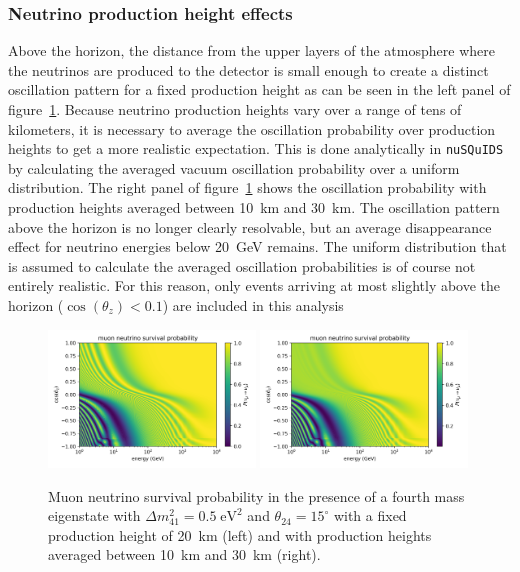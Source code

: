\subsubsection{Neutrino production height effects}
Above the horizon, the distance from the upper layers of the atmosphere where the neutrinos are produced to the detector is small enough to create a distinct oscillation pattern for a fixed production height as can be seen in the left panel of figure~\ref{fig:numu_survival_0.5eV2_full_range}. Because neutrino production heights vary over a range of tens of kilometers, it is necessary to average the oscillation probability over production heights to get a more realistic expectation. This is done analytically in \texttt{nuSQuIDS} by calculating the averaged vacuum oscillation probability over a uniform distribution. The right panel of figure~\ref{fig:numu_survival_0.5eV2_full_range} shows the oscillation probability with production heights averaged between 10~km and 30~km. The oscillation pattern above the horizon is no longer clearly resolvable, but an average disappearance effect for neutrino energies below 20~GeV remains. The uniform distribution that is assumed to calculate the averaged oscillation probabilities is of course not entirely realistic. For this reason, only events arriving at most slightly above the horizon ($\cos(\theta_z)<0.1$) are included in this analysis
\begin{figure}
    \centering
    \includegraphics[width=0.49\textwidth]{figures/measurement/sterile_analysis/physics/dm41_0.5eV2_th24_15deg_no_filter.png}
    \hfill
    \includegraphics[width=0.49\textwidth]{figures/measurement/sterile_analysis/physics/dm41_0.5eV2_th24_15deg_avg_height_10-30km.png}
    \caption{Muon neutrino survival probability in the presence of a fourth mass eigenstate with $\Delta m^2_{41}=0.5\;\mathrm{eV^2}$ and $\theta_{24}=15^\circ$ with a fixed production height of 20~km (left) and with production heights averaged between 10~km and 30~km (right).}
    \label{fig:numu_survival_0.5eV2_full_range}
\end{figure}


